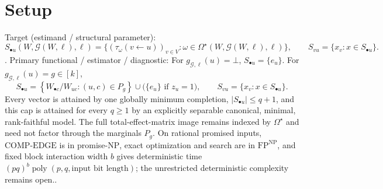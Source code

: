 \documentclass{article}
\begin{document}
\section{Setup}

Target (estimand / structural parameter): \[S_{\bullet u}(W,\mathcal G(W,\ell),\ell)=\{(\tau_{\omega}(v\leftarrow u))_{v\in V}:\omega\in\Omega^{\star}(W,\mathcal G(W,\ell),\ell)\},\qquad S_{vu}=\{x_v:x\in S_{\bullet u}\}.\].
Primary functional / estimator / diagnostic: For \(g_{\mathcal G,\ell}(u)=\bot\), \(S_{\bullet u}=\{e_u\}\). For \(g_{\mathcal G,\ell}(u)=g\in[k]\), \[S_{\bullet u}=\left\{W_{\bullet c}/W_{uc}:(u,c)\in P_g\right\}\cup\bigl(\{e_u\}\text{ if }z_u=1\bigr),\qquad S_{vu}=\{x_v:x\in S_{\bullet u}\}.\] Every vector is attained by one globally minimum completion, \(|S_{\bullet u}|\le q+1\), and this cap is attained for every \(q\ge1\) by an explicitly separable canonical, minimal, rank-faithful model. The full total-effect-matrix image remains indexed by \(\Omega^\star\) and need not factor through the marginals \(P_g\). On rational promised inputs, \(\mathrm{COMP\text{-}EDGE}\) is in promise-\(\mathrm{NP}\), exact optimization and search are in \(\mathrm{FP}^{\mathrm{NP}}\), and fixed block interaction width \(b\) gives deterministic time \((pq)^b\operatorname{poly}(p,q,\text{input bit length})\); the unrestricted deterministic complexity remains open..
\end{document}
